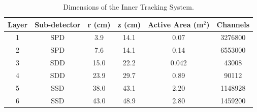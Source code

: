 \documentclass[b5paper,10pt,twoside,oldstyle,classica]{toptesi}
\begin{document}
\begin{table}[tb]
\centering 
\begin{center} %
\renewcommand\arraystretch{1.19} 
\begin{tabular}{|c|c|c|c|c|c|}
\hline
Layer & Sub-detector & r (cm) & z (cm) & Active Area (m$^2$) & Channels\\
\hline
1 & SPD & 3.9 & 14.1 & 0.07 & 3276800\\
2 & SPD & 7.6 & 14.1 & 0.14 & 6553000\\
3 & SDD & 15.0 & 22.2 & 0.042 & 43008\\
4 & SDD & 23.9 & 29.7 & 0.89 & 90112\\
5 & SSD & 38.0 & 43.1 & 2.20 & 1148928\\
6 & SSD & 43.0 & 48.9 & 2.80 & 1459200\\
\hline
\end{tabular}
\caption{Dimensions of the Inner Tracking System.}
\label{ITStable}
\end{center} 
\end{table}
\end{document}
